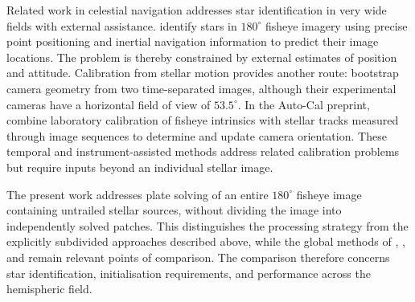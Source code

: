 Related work in celestial navigation addresses star identification in very
wide fields with external assistance. \citet{Li2022} identify stars in
$180^\circ$ fisheye imagery using precise point positioning and inertial
navigation information to predict their image locations. The problem is thereby
constrained by external estimates of position and attitude. Calibration from
stellar motion provides another route: \citet{TeagueChahl2024} bootstrap camera
geometry from two time-separated images, although their experimental cameras
have a horizontal field of view of $53.5^\circ$. In the Auto-Cal preprint,
\citet{Kapali2025} combine laboratory calibration of fisheye intrinsics with
stellar tracks measured through image sequences to determine and update camera
orientation. These temporal and instrument-assisted methods address related
calibration problems but require inputs beyond an individual stellar image.

The present work addresses plate solving of an entire $180^\circ$ fisheye image
containing untrailed stellar sources, without dividing the image into
independently solved patches. This distinguishes the processing strategy from
the explicitly subdivided approaches described above, while the global methods
of \citet{Barghini2019}, \citet{AntunaSanchez2022}, and \citet{Yang2025} remain
relevant points of comparison. The comparison therefore concerns star identification, initialisation
requirements, and performance across the hemispheric field.
